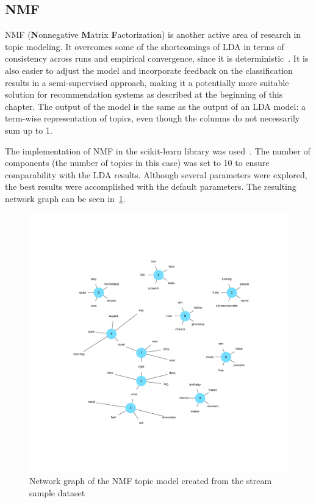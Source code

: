 \subsection{NMF}
\label{subsec:nmf}

NMF (\textbf{N}onnegative \textbf{M}atrix \textbf{F}actorization) is another active area of research in topic modeling.
It overcomes some of the shortcomings of LDA in terms of consistency across runs and empirical convergence,
since it is deterministic~\cite{Choo2013}.
It is also easier to adjust the model and incorporate feedback on the classification results in a semi-supervised approach,
making it a potentially more suitable solution for recommendation systems as described at the beginning of this chapter.
The output of the model is the same as the output of an LDA model: a term-wise representation of topics, even though the columns
do not necessarily sum up to 1.

The implementation of NMF in the scikit-learn library was used~\cite{scikitDocs}.
The number of components (the number of topics in this case) was set to 10 to ensure comparability with the LDA results.
Although several parameters were explored, the best results were accomplished with the default parameters.
The resulting network graph can be seen in~\ref{fig:nmf_network_graph}.

\begin{figure}
    \centering
    \caption{Network graph of the NMF topic model created from the stream sample dataset}
    \label{fig:nmf_network_graph}
    \includegraphics[width=\textwidth]{../figures/nmf_network_graph.pdf}
\end{figure}

